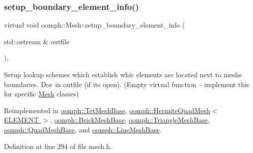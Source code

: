\mbox{\label{classoomph_1_1Mesh_a413cbcbea4fb1111703da9ee97429640}} 
\subsubsection{\texorpdfstring{setup\+\_\+boundary\+\_\+element\+\_\+info()}{setup\_boundary\_element\_info()}\hspace{0.1cm}{\footnotesize\ttfamily [2/2]}}
{\footnotesize\ttfamily virtual void oomph\+::\+Mesh\+::setup\+\_\+boundary\+\_\+element\+\_\+info (\begin{DoxyParamCaption}\item[{std\+::ostream \&}]{outfile }\end{DoxyParamCaption})\hspace{0.3cm}{\ttfamily [inline]}, {\ttfamily [virtual]}}



Setup lookup schemes which establish whic elements are located next to mesh\textquotesingle{}s boundaries. Doc in outfile (if it\textquotesingle{}s open). (Empty virtual function -- implement this for specific \hyperlink{classoomph_1_1Mesh}{Mesh} classes) 



Reimplemented in \hyperlink{classoomph_1_1TetMeshBase_a5982b96584e7f60eeb62f51153ef29f4}{oomph\+::\+Tet\+Mesh\+Base}, \hyperlink{classoomph_1_1HermiteQuadMesh_a0e4cd3df0828e87a762c61b09121e1c0}{oomph\+::\+Hermite\+Quad\+Mesh$<$ E\+L\+E\+M\+E\+N\+T $>$}, \hyperlink{classoomph_1_1BrickMeshBase_a26aa6ff19735538e598bee956ad3d957}{oomph\+::\+Brick\+Mesh\+Base}, \hyperlink{classoomph_1_1TriangleMeshBase_a187fd9dbc558b9d19a02d92ce876507c}{oomph\+::\+Triangle\+Mesh\+Base}, \hyperlink{classoomph_1_1QuadMeshBase_ac61bda5612c87848bb640c8e24371a54}{oomph\+::\+Quad\+Mesh\+Base}, and \hyperlink{classoomph_1_1LineMeshBase_a309fc1aa6fe508a32cd6c0e863d5b1c6}{oomph\+::\+Line\+Mesh\+Base}.



Definition at line 294 of file mesh.\+h.

\mbox{\label{classoomph_1_1Mesh_a1ef2de4e0406dd4ed6317cf857b2c3b1}} 
